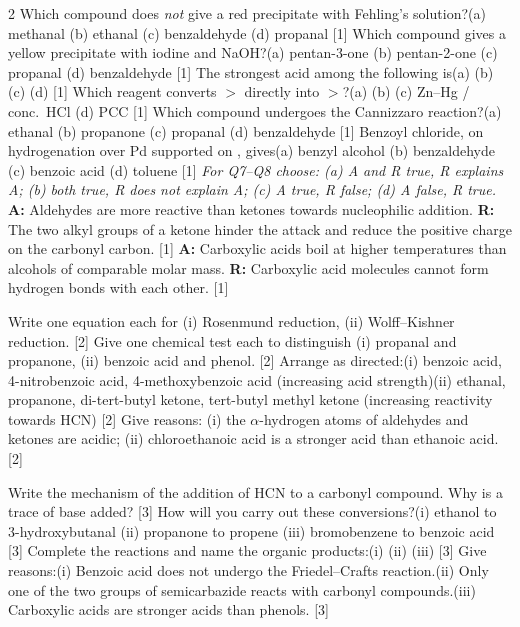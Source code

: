 \documentclass[10pt,a4paper]{extarticle}
\newcommand{\mk}[1]{{\scriptsize\color{black!55}[#1]}}
\begin{document}
\begin{multicols}{2}\raggedcolumns
{}
\Q Which compound does \emph{not} give a red precipitate with Fehling's solution?\nl (a) methanal \quad (b) ethanal \quad (c) benzaldehyde \quad (d) propanal \mk{1}
\Q Which compound gives a yellow precipitate with iodine and NaOH?\nl (a) pentan-3-one \quad (b) pentan-2-one \quad (c) propanal \quad (d) benzaldehyde \mk{1}
\Q The strongest acid among the following is\nl (a)  \quad (b)  \quad (c)  \quad (d)  \mk{1}
\Q Which reagent converts $>$ directly into $>$?\nl (a)  \quad (b)  \quad (c) Zn--Hg / conc.\ HCl \quad (d) PCC \mk{1}
\Q Which compound undergoes the Cannizzaro reaction?\nl (a) ethanal \quad (b) propanone \quad (c) propanal \quad (d) benzaldehyde \mk{1}
\Q Benzoyl chloride, on hydrogenation over Pd supported on , gives\nl (a) benzyl alcohol \quad (b) benzaldehyde \quad (c) benzoic acid \quad (d) toluene \mk{1}
\nl\textit{For Q7--Q8 choose: (a) A and R true, R explains A; (b) both true, R does not explain A; (c) A true, R false; (d) A false, R true.}
\Q \textbf{A:} Aldehydes are more reactive than ketones towards nucleophilic addition. \textbf{R:} The two alkyl groups of a ketone hinder the attack and reduce the positive charge on the carbonyl carbon. \mk{1}
\Q \textbf{A:} Carboxylic acids boil at higher temperatures than alcohols of comparable molar mass. \textbf{R:} Carboxylic acid molecules cannot form hydrogen bonds with each other. \mk{1}

\Q Write one equation each for (i) Rosenmund reduction, (ii) Wolff--Kishner reduction. \mk{2}
\Q Give one chemical test each to distinguish (i) propanal and propanone, (ii) benzoic acid and phenol. \mk{2}
\Q Arrange as directed:\nl (i) benzoic acid, 4-nitrobenzoic acid, 4-methoxybenzoic acid (increasing acid strength)\nl (ii) ethanal, propanone, di-tert-butyl ketone, tert-butyl methyl ketone (increasing reactivity towards HCN) \mk{2}
\Q Give reasons: (i) the $\alpha$-hydrogen atoms of aldehydes and ketones are acidic; (ii) chloroethanoic acid is a stronger acid than ethanoic acid. \mk{2}

\Q Write the mechanism of the addition of HCN to a carbonyl compound. Why is a trace of base added? \mk{3}
\Q How will you carry out these conversions?\nl (i) ethanol to 3-hydroxybutanal \quad (ii) propanone to propene \quad (iii) bromobenzene to benzoic acid \mk{3}
\Q Complete the reactions and name the organic products:\nl (i) \nl (ii) \nl (iii)  \mk{3}
\Q Give reasons:\nl (i) Benzoic acid does not undergo the Friedel--Crafts reaction.\nl (ii) Only one of the two  groups of semicarbazide reacts with carbonyl compounds.\nl (iii) Carboxylic acids are stronger acids than phenols. \mk{3}


\end{multicols}
\end{document}
